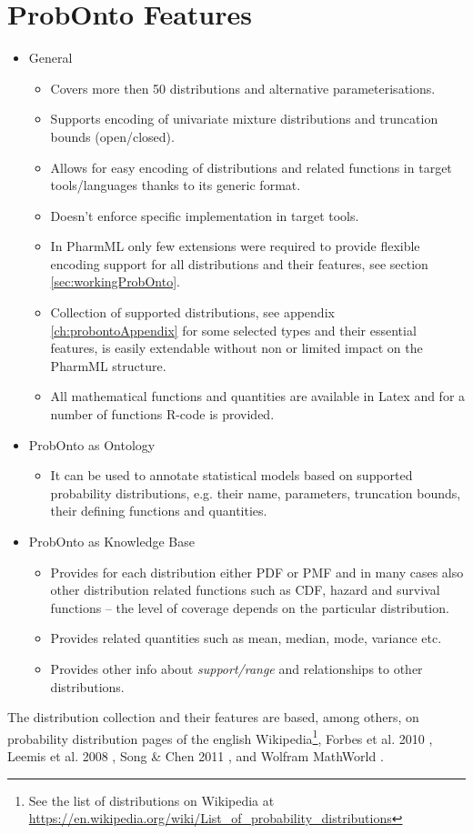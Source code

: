 \section{ProbOnto Features}
\begin{itemize}
\item
General 
\begin{itemize}
\item
Covers more then 50 distributions and alternative parameterisations.
\item
Supports encoding of univariate mixture distributions and truncation bounds (open/closed).
\item
Allows for easy encoding of distributions and related functions in target 
tools/languages thanks to its generic format.
\item
Doesn't enforce specific implementation in target tools.
\item
In PharmML only few extensions were required to provide flexible encoding support
for all distributions and their features, see section \ref{sec:workingProbOnto}.
\item
Collection of supported distributions, see appendix \ref{ch:probontoAppendix} for 
some selected types and their essential features, is easily extendable 
without non or limited impact on the PharmML structure.
\item
All mathematical functions and quantities are available in Latex and  for a number 
of functions R-code is provided.
\end{itemize}
\item
ProbOnto as Ontology
\begin{itemize}
\item
It can be used to annotate statistical models based on supported probability 
distributions, e.g. their name, parameters, truncation bounds, their defining 
functions and quantities.
\end{itemize}
\item
ProbOnto as Knowledge Base
\begin{itemize}
\item
Provides for each distribution either PDF or PMF and in many cases also 
other distribution related functions such as CDF, hazard and survival functions 
-- the level of coverage depends on the particular distribution. 
\item
Provides related quantities such as mean, median, mode, variance etc.
\item
Provides other info about \emph{support/range} and relationships to other distributions.
\end{itemize}
\end{itemize}
The distribution collection and their features are based, among others, on
probability distribution pages of the english Wikipedia\footnote{See the list of 
distributions on Wikipedia at \url{https://en.wikipedia.org/wiki/List_of_probability_distributions}}, 
Forbes et al. 2010 \cite{Forbes:2010jk}, Leemis et al. 2008 \cite{Leemis:2008tg}, 
Song \& Chen 2011 \cite{song2011eighty}, and 
Wolfram MathWorld \cite{weisstein2007wolfram}.

